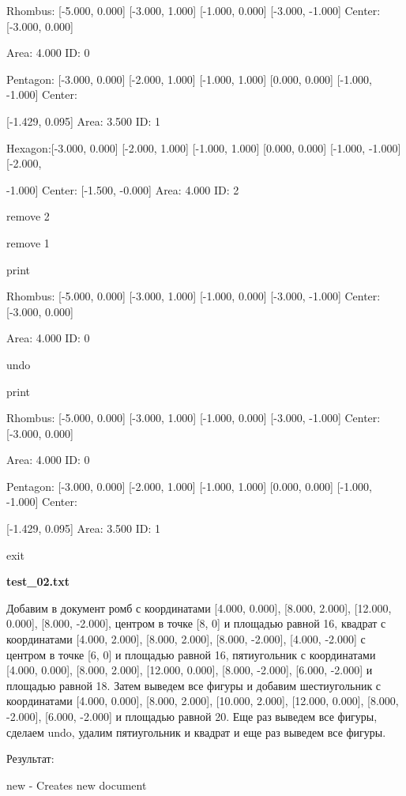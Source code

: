 \documentclass[a4paper, 12pt]{article}
\begin{document}
Rhombus: [-5.000, 0.000] [-3.000, 1.000] [-1.000, 0.000] [-3.000, -1.000] Center: [-3.000, 0.000] 

Area: 4.000 ID: 0

Pentagon: [-3.000, 0.000] [-2.000, 1.000] [-1.000, 1.000] [0.000, 0.000] [-1.000, -1.000] Center: 

[-1.429, 0.095] Area: 3.500 ID: 1


Hexagon:[-3.000, 0.000] [-2.000, 1.000] [-1.000, 1.000] [0.000, 0.000] [-1.000, -1.000] [-2.000, 

-1.000] Center: [-1.500, -0.000] Area: 4.000 ID: 2

remove 2

remove 1

print

Rhombus: [-5.000, 0.000] [-3.000, 1.000] [-1.000, 0.000] [-3.000, -1.000] Center: [-3.000, 0.000] 

Area: 4.000 ID: 0

undo

print

Rhombus: [-5.000, 0.000] [-3.000, 1.000] [-1.000, 0.000] [-3.000, -1.000] Center: [-3.000, 0.000] 

Area: 4.000 ID: 0

Pentagon: [-3.000, 0.000] [-2.000, 1.000] [-1.000, 1.000] [0.000, 0.000] [-1.000, -1.000] Center: 

[-1.429, 0.095] Area: 3.500 ID: 1

exit






\vspace{3ex}

\textbf{test\_02.txt} 

Добавим в документ ромб с координатами [4.000, 0.000], [8.000, 2.000], [12.000, 0.000], [8.000, -2.000], центром в точке [8, 0] и площадью равной 16, квадрат с координатами [4.000, 2.000], [8.000, 2.000], [8.000, -2.000], [4.000, -2.000] с центром в точке [6, 0] и площадью равной 16, пятиугольник с координатами [4.000, 0.000], [8.000, 2.000], [12.000, 0.000], [8.000, -2.000], [6.000, -2.000] и площадью равной 18. Затем выведем все фигуры и добавим шестиугольник с координатами [4.000, 0.000], [8.000, 2.000], [10.000, 2.000], [12.000, 0.000], [8.000, -2.000], [6.000, -2.000] и площадью равной 20. Еще раз выведем все фигуры, сделаем undo, удалим пятиугольник и квадрат и еще раз выведем все фигуры.

Результат:

new - Creates new document
\end{document}
